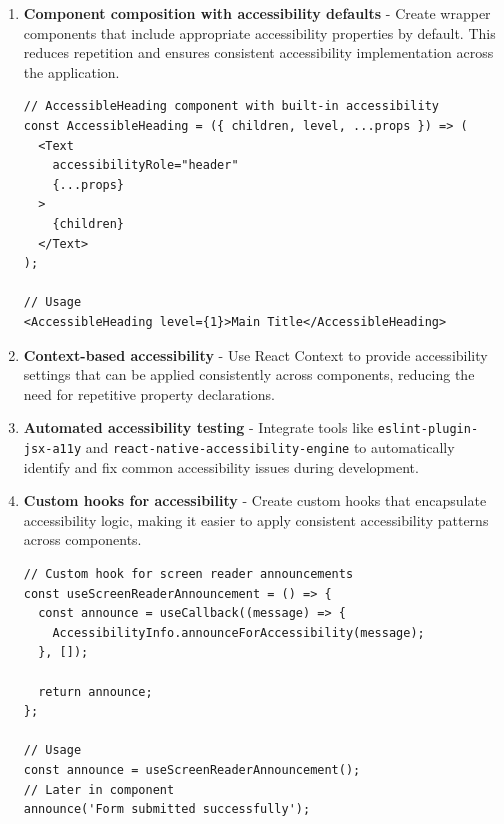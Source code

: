 \begin{enumerate}
    \item \textbf{Component composition with accessibility defaults} - Create wrapper components that include appropriate accessibility properties by default. This reduces repetition and ensures consistent accessibility implementation across the application.
    
    \begin{lstlisting}[style=ReactNativeStyle, caption=React Native accessibility wrapper component, label=lst:rn-wrapper]
// AccessibleHeading component with built-in accessibility
const AccessibleHeading = ({ children, level, ...props }) => (
  <Text
    accessibilityRole="header"
    {...props}
  >
    {children}
  </Text>
);

// Usage
<AccessibleHeading level={1}>Main Title</AccessibleHeading>
    \end{lstlisting}
    
    \item \textbf{Context-based accessibility} - Use React Context to provide accessibility settings that can be applied consistently across components, reducing the need for repetitive property declarations.
    
    \item \textbf{Automated accessibility testing} - Integrate tools like \texttt{eslint-plugin-jsx-a11y} and \texttt{react-native-accessibility-engine} to automatically identify and fix common accessibility issues during development.
    
    \item \textbf{Custom hooks for accessibility} - Create custom hooks that encapsulate accessibility logic, making it easier to apply consistent accessibility patterns across components.
    
    \begin{lstlisting}[style=ReactNativeStyle, caption=React Native accessibility hook, label=lst:rn-hook]
// Custom hook for screen reader announcements
const useScreenReaderAnnouncement = () => {
  const announce = useCallback((message) => {
    AccessibilityInfo.announceForAccessibility(message);
  }, []);
  
  return announce;
};

// Usage
const announce = useScreenReaderAnnouncement();
// Later in component
announce('Form submitted successfully');
    \end{lstlisting}
\end{enumerate}

